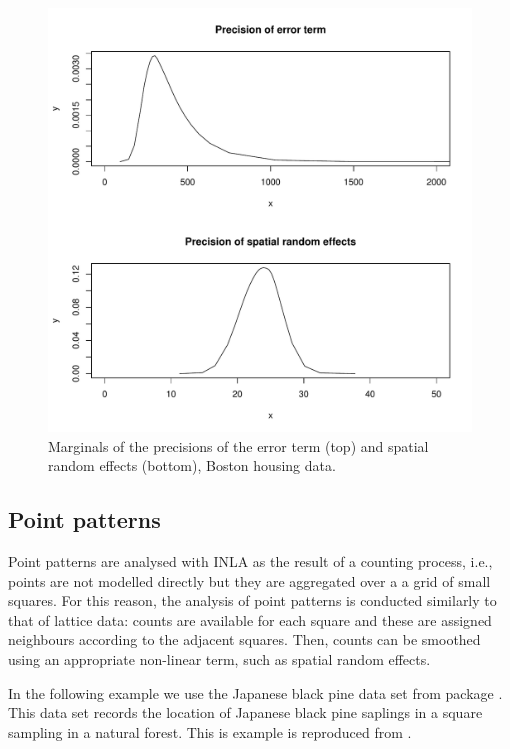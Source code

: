 \documentclass[article]{jss}
\begin{document}
\begin{figure}[h]
\begin{center}
\includegraphics{spatial_inla-004}
\end{center}
\caption{Marginals of the precisions of the error term (top) and
spatial random effects (bottom), Boston housing data.}
\label{fig:marg1}
\end{figure}


\subsection{Point patterns}

Point patterns are analysed with INLA as the result of a counting process,
i.e., points are not modelled directly but they are aggregated over a a grid
of small squares. For this reason, the analysis of point patterns is conducted
similarly to that of lattice data: counts are available for each square and 
these are assigned neighbours according to the adjacent squares. Then, counts
can be smoothed using an appropriate non-linear term, such as spatial
random effects.

In the following example we use the Japanese black pine data set from
 package . This data set records the location of
Japanese black pine saplings in a square sampling in a natural forest.  This
is example is reproduced from \citet{GomezRubioetal:2013}.
\end{document}
